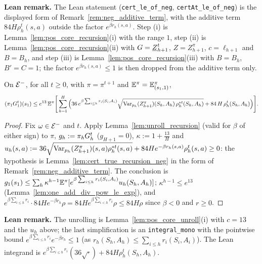 \textbf{Lean remark.} The Lean statement (\texttt{cert\_le\_of\_neg}, \texttt{certAt\_le\_of\_neg}) is the
displayed form of Remark~\ref{rem:neg_additive_term}, with the additive term $84H\rho^t_h(s,a)$
outside the factor $e^{\beta r_h(s,a)}$. Step (i) is Lemma~\ref{lem:pos_core_recursion}(i) with the
range $1$, step (ii) is Lemma~\ref{lem:pos_core_recursion}(ii) with $G = \underline{Z}^t_{h+1}$, $Z = Z^\pi_{h+1}$,
$c = \ell_{h+1}$ and $B = B_h$, and step (iii) is Lemma~\ref{lem:pos_core_recursion}(iii) with $B = B_h$,
$B' = C = 1$; the factor $e^{\beta r_h(s,a)} \le 1$ is then dropped from the additive term only.

\begin{lemma}\label{lem:cert_unrolled_neg}
\leanok
{}
On $\mathcal{E}^-$, for all $t \ge 0$, with $\pi = \pi^{t+1}$ and $\mathbb{E}^\pi = \mathbb{E}^\pi_{(s_1, 1)}$,
\[
  (\pi_1G_1^t)(s_1) \le e^{13}\,\mathbb{E}^\pi\Bigg[\sum_{h=1}^H
  \Big(36\, e^{\beta\sum_{i \le h} r_i(S_i, A_i)}\sqrt{\operatorname{Var}_{p_h}(Z^\pi_{h+1})(S_h, A_h)\,\rho^{*t}_h(S_h, A_h)}
  + 84\,H\,\rho^t_h(S_h, A_h)\Big)\Bigg] .
\]
\end{lemma}

\begin{proof}
\leanok
Fix $\omega \in \mathcal{E}^-$ and $t$. Apply Lemma~\ref{lem:unroll_recursion} (valid for $\beta$ of either
sign) to $\pi$, $g_h := \pi_hG_h^t$ ($g_{H+1} = 0$), $\kappa := 1 + \frac{13}{H}$ and
$u_h(s,a) := 36\sqrt{\operatorname{Var}_{p_h}(Z^\pi_{h+1})(s,a)\rho^{*t}_h(s,a)} + 84He^{-\beta r_h(s,a)}\rho^t_h(s,a) \ge 0$: the
hypothesis is Lemma~\ref{lem:cert_true_recursion_neg} in the form of
Remark~\ref{rem:neg_additive_term}. The conclusion is
$g_1(s_1) \le \sum_h\kappa^{h-1}\mathbb{E}^\pi[e^{\beta\sum_{i \le h}r_i(S_i,A_i)}u_h(S_h,A_h)]$; $\kappa^{h-1} \le e^{13}$
(Lemma~\ref{lem:one_add_div_pow_le_exp}), and
$e^{\beta\sum_{i \le h}r_i}\cdot 84He^{-\beta r_h}\rho = 84He^{\beta\sum_{i < h}r_i}\rho \le 84H\rho$ since $\beta < 0$ and $r \ge 0$.
\end{proof}

\textbf{Lean remark.} The unrolling is Lemma~\ref{lem:pos_core_unroll}(i) with $c = 13$ and the $u_h$ above;
the last simplification is an \texttt{integral\_mono} with the pointwise bound
$e^{\beta\sum_{i \le h}r_i}e^{-\beta r_h} \le 1$ (as $r_h(S_h, A_h) \le \sum_{i \le h}r_i(S_i, A_i)$). The Lean
integrand is $e^{\beta\sum_{i \le h}r_i}(36\sqrt{\cdot}) + 84H\rho^t_h(S_h, A_h)$.


